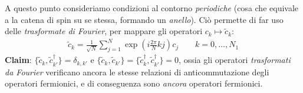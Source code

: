 \documentclass[../../InformazioneQuantistica.tex]{subfiles}
\begin{document}
A questo punto consideriamo condizioni al contorno \textit{periodiche} (cosa che equivale a  la catena di spin su se stessa, formando un \textit{anello}). Ciò permette di far uso delle \textit{trasformate di Fourier}, per mappare gli operatori $c_k \mapsto \tilde{c}_k$:
\begin{align*}
\tilde{c}_k = \frac{1}{\sqrt{N}}\sum_{j=1}^N \exp\left(i\frac{2\pi}{N}kj \right) c_j \qquad k=0,\dots, N_1
\end{align*}
\textbf{Claim}: $\{\tilde{c}_k, \tilde{c}_{k'}^\dag\} = \delta_{k,k'}$ e $\{\tilde{c}_k, \tilde{c}_{k'}\} = \{\tilde{c}_k^\dag, \tilde{c}_{k'}^\dag \} = 0$, ossia gli operatori \textit{trasformati da Fourier} verificano ancora le stesse relazioni di anticommutazione degli operatori fermionici, e di conseguenza sono \textit{ancora} operatori fermionici.\\
\end{document}

